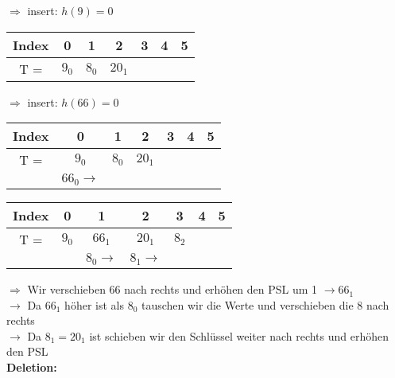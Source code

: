 $\Rightarrow$ insert: $h(9)=0$
\begin{center}
\begin{tabular}{|c|c|c|c|c|c|c|}
\hline
Index & 0 & 1 & 2 & 3 & 4 & 5\\
\hline
T = & $9_0$ & $8_0$ & $20_1$ & & &\\
\hline
\end{tabular}
\end{center}



\newpage
$\Rightarrow$ insert: $h(66)=0$
\begin{multicols}{2}
\begin{center}
\begin{tabular}{|c|c|c|c|c|c|c|}
\hline
Index & 0 & 1 & 2 & 3 & 4 & 5\\
\hline
T = & $9_0$ & $8_0$ & $20_1$ & & &\\
\hline
& $66_0 \rightarrow$ &  & & & &\\
\hline
\end{tabular}
\end{center}


\columnbreak
\begin{center}
\begin{tabular}{|c|c|c|c|c|c|c|}
\hline
Index & 0 & 1 & 2 & 3 & 4 & 5\\
\hline
T = & $9_0$ & $66_1$ & $20_1$ & $8_2$ & &\\
\hline
&  & $8_0 \rightarrow$ & $8_1 \rightarrow$ & & &\\
\hline
\end{tabular}
\end{center}
\end{multicols}
$\Rightarrow$ Wir verschieben $66$ nach rechts und erhöhen den PSL um 1 $\rightarrow 66_1$\\
$\rightarrow$ Da $66_1$ höher ist als $8_0$ tauschen wir die Werte und verschieben die 8 nach rechts\\
$\rightarrow$ Da $8_1 = 20_1$ ist schieben wir den Schlüssel weiter nach rechts und erhöhen den PSL\\


\setlength{\columnseprule}{1pt}
\noindent
\textbf{Deletion:}\\

